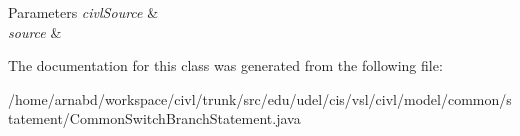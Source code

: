 \begin{DoxyParams}{Parameters}
{\em civl\+Source} & \\
\hline
{\em source} & \\
\hline
\end{DoxyParams}


The documentation for this class was generated from the following file\+:\begin{DoxyCompactItemize}
\item 
/home/arnabd/workspace/civl/trunk/src/edu/udel/cis/vsl/civl/model/common/statement/Common\+Switch\+Branch\+Statement.\+java\end{DoxyCompactItemize}
